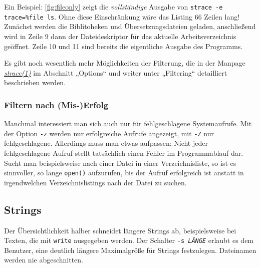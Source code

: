 Ein Beispiel: \autoref{fig:fileonly} zeigt die \emph{vollständige} Ausgabe von \texttt{strace -e
trace=\%file ls}. Ohne diese Einschränkung wäre das Listing 66 Zeilen lang! Zunächst werden
die Biblitoheken und Übersetzungsdateien geladen, anschließend wird in Zeile 9 dann der
Dateideskriptor für das aktuelle Arbeitsverzeichnis geöffnet. Zeile 10 und 11 sind bereits
die eigentliche Ausgabe des Programms.

Es gibt noch wesentlich mehr Möglichkeiten der Filterung, die in der Manpage
\href{http://man7.org/linux/man-pages/man1/strace.1.html#OPTIONS}{\emph{strace(1)}} im Abschnitt
„Options“ und weiter unter „Filtering“ detailliert beschrieben werden.

\subsubsection{Filtern nach (Mis-)Erfolg}

Manchmal interessiert man sich auch nur für fehlgeschlagene Systemaufrufe. Mit der Option
\texttt{-z} werden nur erfolgreiche Aufrufe angezeigt, mit \texttt{-Z} nur fehlgeschlagene.
Allerdings muss man etwas aufpassen: Nicht jeder fehlgeschlagene Aufruf stellt tatsächlich einen
Fehler im Programmablauf dar. Sucht man beispielsweise nach einer Datei in einer Verzeichnisliste,
so ist es sinnvoller, so lange \texttt{open()} aufzurufen, bis der Aufruf erfolgreich ist
anstatt in irgendwelchen Verzeichnislistings nach der Datei zu suchen.


\subsection{Strings}

Der Übersichtlichkeit halber schneidet \strace{} längere Strings ab, beispielsweise bei Texten, die
mit \texttt{write} ausgegeben werden. Der Schalter \texttt{-s \emph{LÄNGE}} erlaubt es dem
Benutzer, eine deutlich längere Maximalgröße für Strings festzulegen. Dateinamen werden nie
abgeschnitten.
